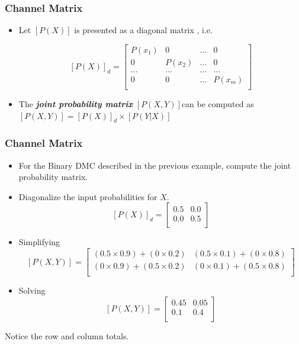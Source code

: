 \documentclass[a4]{beamer}
\begin{document}
\begin{frame}
\frametitle{Channel Matrix}
\begin{itemize}
\item Let $[P(X)]$ is presented as a diagonal matrix , i.e.

\[  [P(X)]_d  = \left[ \begin{array}{cccc}
P(x_1) &0 & \ldots & 0 \\
0 & P(x_2)& \ldots & 0 \\
\ldots & \ldots & \ldots & \ldots \\
0& 0 & \ldots & P(x_m) \\
\end{array} \right] \]
\item The \emph{\textbf{ joint probability matrix}} $[P(X,Y)]$can be computed as
$[P(X,Y)]  = [P(X)]_d\times [P(Y|X)]$
\end{itemize}
\end{frame}

\begin{frame}
\frametitle{Channel Matrix}
\begin{itemize}
\item For the Binary DMC described in the previous example, compute the joint probability matrix.
\item Diagonalize the input probabilities for $X$.
\[  [P(X)]_d  = \left[ \begin{array}{cc}
0.5 & 0.0  \\
0.0 & 0.5\\
\end{array} \right] \]

\item Simplifying
\[  [P(X,Y)]  =  \left[ \begin{array}{cc}
(0.5 \times 0.9)+(0 \times 0.2) & (0.5 \times 0.1)+(0 \times 0.8) \\
(0 \times 0.9)+(0.5 \times 0.2) & (0 \times 0.1)+(0.5 \times 0.8) \\
\end{array} \right]  \]


\item Solving
\[  [P(X,Y)]  =  \left[ \begin{array}{cc}
0.45 & 0.05 \\
0.1  & 0.4 \\
\end{array} \right]  \]
\end{itemize}
Notice the row and column totals.
\end{frame}
\end{document}
